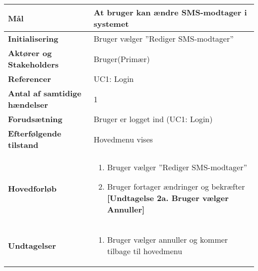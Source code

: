 \begin{table}[H] \centering
\begin{tabular}{|p{6cm}|p{8cm}|}
	\hline
\textbf{Mål} &
At bruger kan ændre SMS-modtager i systemet\\\hline

\textbf{Initialisering} &
Bruger vælger ''Rediger SMS-modtager'' \\\hline
 
\textbf{Aktører og Stakeholders} &
Bruger(Primær) \\\hline

\textbf{Referencer} &
UC1: Login  \\\hline

\textbf{Antal af samtidige hændelser} &
1  \\\hline

\textbf{Forudsætning} &
Bruger er logget ind (UC1: Login)\\\hline

\textbf{Efterfølgende tilstand} &
Hovedmenu vises  \\\hline

\textbf{Hovedforløb} &
\begin{enumerate}

\item Bruger vælger ''Rediger SMS-modtager''
\item Bruger fortager ændringer og bekræfter \newline
\textbf{[Undtagelse 2a. Bruger vælger Annuller]}

\end{enumerate}   
 \\\hline
 
\textbf{Undtagelser}
&\begin{enumerate}[label= 2a.]
\item Bruger vælger annuller og kommer tilbage til hovedmenu
\end{enumerate}
 \\\hline
 

	\end{tabular}
	\label{UC6} 
\end{table}